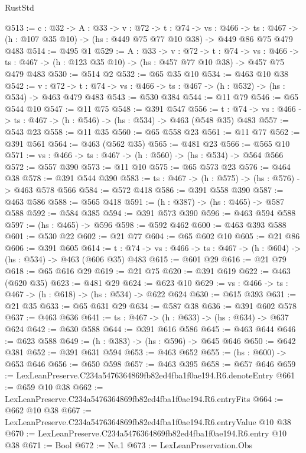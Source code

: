 \begin{lexlean}{RustStd}
\begin{coremodule}
@513 := {c : @32} ->
  {A : @33} ->
  {v : @72} ->
  {t : @74} ->
  {vs : @466} ->
  {ts : @467} -> (h : @107 @35 @10) -> (hs : @449 @75 @77 @10 @38) -> @449 @86 @75 @479 @483
@514 := @495 @1
@529 := {A : @33} ->
  {v : @72} ->
  {t : @74} ->
  {vs : @466} -> {ts : @467} -> (h : @123 @35 @10) -> (hs : @457 @77 @10 @38) -> @457 @75 @479 @483
@530 := @514 @2
@532 := @65 @35 @10
@534 := @463 @10 @38
@542 := {v : @72} ->
  {t : @74} -> {vs : @466} -> {ts : @467} -> (h : @532) -> (hs : @534) -> @463 @479 @483
@543 := @530 @384
@544 := @11 @79
@546 := @65 @544 @10
@547 := @11 @75
@548 := @391 @547
@556 := {t : @74} -> {vs : @466} -> {ts : @467} -> (h : @546) -> (hs : @534) -> @463 (@548 @35) @483
@557 := @543 @23
@558 := @11 @35
@560 := @65 @558 @23
@561 := @11 @77
@562 := @391 @561
@564 := @463 (@562 @35)
@565 := @481 @23
@566 := @565 @10
@571 := {vs : @466} -> {ts : @467} -> (h : @560) -> (hs : @534) -> @564 @566
@572 := @557 @390
@573 := @11 @10
@575 := @65 @573 @23
@576 := @464 @38
@578 := @391 @544 @390
@583 := {ts : @467} -> (h : @575) -> (hs : @576) -> @463 @578 @566
@584 := @572 @418
@586 := @391 @558 @390
@587 := @463 @586
@588 := @565 @418
@591 := (h : @387) -> (hs : @465) -> @587 @588
@592 := @584 @385
@594 := @391 @573 @390
@596 := @463 @594 @588
@597 := (hs : @465) -> @596
@598 := @592 @462
@600 := @463 @393 @588
@601 := @530 @22
@602 := @21 @77
@604 := @65 @602 @10
@605 := @21 @86
@606 := @391 @605
@614 := {t : @74} -> {vs : @466} -> {ts : @467} -> (h : @604) -> (hs : @534) -> @463 (@606 @35) @483
@615 := @601 @29
@616 := @21 @79
@618 := @65 @616 @29
@619 := @21 @75
@620 := @391 @619
@622 := @463 (@620 @35)
@623 := @481 @29
@624 := @623 @10
@629 := {vs : @466} -> {ts : @467} -> (h : @618) -> (hs : @534) -> @622 @624
@630 := @615 @393
@631 := @21 @35
@633 := @65 @631 @29
@634 := @587 @38
@636 := @391 @602 @578
@637 := @463 @636
@641 := {ts : @467} -> (h : @633) -> (hs : @634) -> @637 @624
@642 := @630 @588
@644 := @391 @616 @586
@645 := @463 @644
@646 := @623 @588
@649 := (h : @383) -> (hs : @596) -> @645 @646
@650 := @642 @381
@652 := @391 @631 @594
@653 := @463 @652
@655 := (hs : @600) -> @653 @646
@656 := @650 @598
@657 := @463 @395
@658 := @657 @646
@659 := LexLeanPreserve.C234a5476364869fb82ed4fba1f0ae194.R6.denoteEntry
@661 := @659 @10 @38
@662 := LexLeanPreserve.C234a5476364869fb82ed4fba1f0ae194.R6.entryFits
@664 := @662 @10 @38
@667 := LexLeanPreserve.C234a5476364869fb82ed4fba1f0ae194.R6.entryValue @10 @38
@670 := LexLeanPreserve.C234a5476364869fb82ed4fba1f0ae194.R6.entry @10 @38
@671 := Bool
@672 := Ne.{1}
@673 := LexLeanPreservation.Obs

\end{coremodule}
\end{lexlean}
